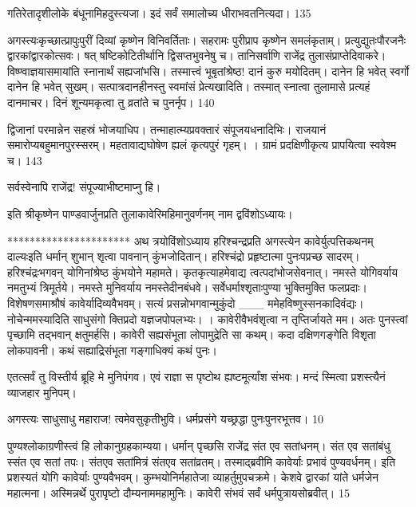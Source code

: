 गतिरेतादृशीलोके बंधूनामिहदुस्त्यजा।
 इदं सर्वं समालोच्य धीराभवतनित्यदा।
 135

 
अगस्त्यःकृच्छात्प्रापुःपुरीं दिव्यां कृष्णेन विनिवर्तिताः।
 सहरामः पुरीप्राप कृष्णेन समलंकृताम्।
 प्रत्युद्युतःपौरजनैः द्वारकांद्वारकोत्सवः।
 षत् षष्टिकोटितीर्थानि द्विसप्तभुवनेषु च।
 तानिसर्वाणि राजेंद्र तुलासंप्राप्तेदिवाकरे।
 विष्ण्वाज्ञयासमायांति स्नानार्थं सह्यजांभसि।
 तस्मात्त्वं भूबृतांश्रेष्ठ! दानं कुरु मयोदितम्।
 दानेन हि भवेत् स्वर्गो दानेन हि भवेत् सुखम्।
 सत्पात्रदानहीनस्तु स्वमांसं प्रेत्यखादिति।
 तस्मात् स्नात्वा तुलामासे प्रत्यहं दानमाचर।
 दिनं शून्यमकृत्वा तु व्रतांते च पुनर्नृप।
 140

  द्विजानां परमान्नेन सहस्रं भोजयाधिप।
 तन्माहात्म्यप्रवक्तारं संपूजयधनादिभिः।
 राजयानं समारोप्यबहुमानपुरस्सरम्।
 महतावाद्यघोषेण ह्यलं कृत्यपुरं गृहम्।
 ।
 ग्रामं प्रदक्षिणीकृत्य प्रापयित्वा स्ववेश्म च।
 143

  सर्वस्वेनापि राजेंद्र! संपूज्याभीष्टमाप्नु हि।
 
इति श्रीकृष्णेन पाण्डवार्जुनप्रति तुलाकावेरिमहिमानुवर्णनम् नाम द्वविंशोऽध्यायः।

**********************
अथ त्रयोविंशोऽध्याय हरिश्चन्द्रप्रति अगस्त्येन कावेर्युत्पत्तिकथनम् दाल्यःइति धर्मान् शुभान् शृत्वा पावनान् कुंभजोदितान्।
 हरिश्चंद्रो प्रहृष्टात्मा पुनःपप्रच्छ सादरम्।
 हरिश्चंद्रःभगवन् योगिनांश्रेष्ठ कुंभयोने महामते।
 कृतकृत्याहमेवाद्य त्वत्पदांभोजसेवनात्।
 नमस्ते योगिवर्याय नमतुभ्यं त्रिमूर्तये।
 नमस्ते मुनिवर्याय नमस्तेदीनबंधवे।
 सर्वेधर्माश्शृताःपुण्या भुक्तिमुक्ति फलप्रदाः।
 विशेषणसमाश्रौषं कावेर्यादिव्यवैभवम्।
 सत्यं प्रसन्नोभगवान्मुकुंदो
___ ममेहविष्णुस्सनकादिवंद्यः।
 नोचेन्ममस्यादिति साधुसंगो
क्तिप्रदो यज्ञजपोपलभ्यः।
।
 कावेरीवैभवंशृत्वा न तृप्तिर्जायते मम।
 अतः पुनस्त्वां पृच्छामि तद्भवान् क्षतुमर्हसि।
 कावेरी सह्यसंभूता लोपामुद्रेति सा कथम्।
 कदा दक्षिणगङ्गेति विशृता लोकपावनी।
 कथं सह्याद्रिसंभूता गङ्गाधिक्यं कथं पुनः।
 
एतत्सर्वं तु विस्तीर्य ब्रूहि मे मुनिपंगव।
 एवं राज्ञा स पृष्टोथ ह्यष्टमूर्त्यांश संभवः।
 मन्दं स्मित्वा प्रशस्त्यैनं व्याजहार मुनिपम्।
 
अगस्त्यः
साधुसाधु महाराज! त्वमेवसुकृतीभुवि।
 धर्मप्रसंगे यच्छ्रद्धा पुनःपुनरभूत्तव।
 10

  पुण्यश्लोकाग्रणीस्त्वं हि लोकानुग्रहकाम्यया।
 धर्मान् पृच्छसि राजेंद्र संत एव सतांधनम्।
 संत एव सतांबंधु स्संत एव सतां तपः।
 संतएव सतांमित्रं संतएव सतांव्रतम्।
 तस्माद्ब्रवीमि कावेर्याः प्रभावं पुण्यवर्धनम्।
 इति प्रशस्यतं योगि कावेर्याः पुण्यवैभवम्।
 कुम्भयोनिर्महातेजा व्याहर्तुमुपचक्रमे।
 केशवे द्वारकां यांते धर्मजेन महात्मना।
 अस्मिन्नर्थे पुरापृष्टो दौम्यनाममहामुनिः।
 कावेरी संभवं सर्वं धर्मपुत्रायसोब्रवीत्।
 15

